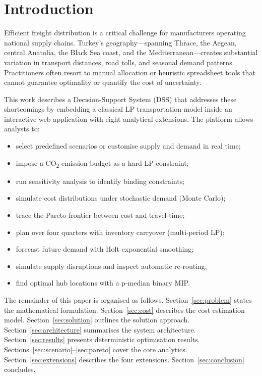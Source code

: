 \documentclass[conference]{IEEEtran}
\begin{document}
\section{Introduction}
\label{sec:intro}

Efficient freight distribution is a critical challenge for manufacturers
operating national supply chains.
Turkey's geography---spanning Thrace, the Aegean, central Anatolia, the
Black Sea coast, and the Mediterranean---creates substantial variation in
transport distances, road tolls, and seasonal demand patterns.
Practitioners often resort to manual allocation or heuristic spreadsheet
tools that cannot guarantee optimality or quantify the cost of uncertainty.

This work describes a Decision-Support System (DSS) that addresses these
shortcomings by embedding a classical LP transportation model inside an
interactive web application with eight analytical extensions.
The platform allows analysts to:
\begin{itemize}
  \item select predefined scenarios or customise supply and demand in real time;
  \item impose a CO\textsubscript{2} emission budget as a hard LP constraint;
  \item run sensitivity analysis to identify binding constraints;
  \item simulate cost distributions under stochastic demand (Monte Carlo);
  \item trace the Pareto frontier between cost and travel-time;
  \item plan over four quarters with inventory carryover (multi-period LP);
  \item forecast future demand with Holt exponential smoothing;
  \item simulate supply disruptions and inspect automatic re-routing;
  \item find optimal hub locations with a p-median binary MIP.
\end{itemize}

The remainder of this paper is organised as follows.
Section~\ref{sec:problem} states the mathematical formulation.
Section~\ref{sec:cost} describes the cost estimation model.
Section~\ref{sec:solution} outlines the solution approach.
Section~\ref{sec:architecture} summarises the system architecture.
Section~\ref{sec:results} presents deterministic optimisation results.
Sections~\ref{sec:scenario}--\ref{sec:pareto} cover the core analytics.
Section~\ref{sec:extensions} describes the four extensions.
Section~\ref{sec:conclusion} concludes.
\end{document}
